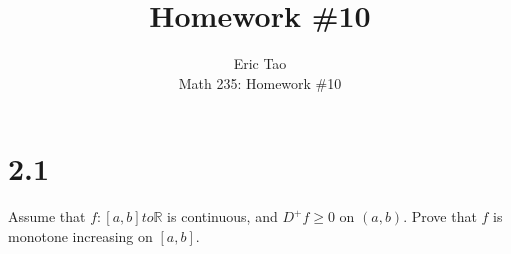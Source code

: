 \documentclass[10pt]{article}
\newenvironment{problem}[2][Problem]{\begin{trivlist}
\item[\hskip \labelsep {\bfseries #1}\hskip \labelsep {\bfseries #2.}]}{\end{trivlist}}
\begin{document}
 
\title{Homework \#10}
\author{Eric Tao\\
Math 235: Homework \#10}
\maketitle
 
\section*{2.1}

\begin{problem}{5.4.6}

Assume that $f: [a,b] to \mathbb{R}$ is continuous, and $D^+ f \geq 0$ on $(a,b)$. Prove that $f$ is monotone increasing on $[a,b]$.

\end{problem}
\end{document}

